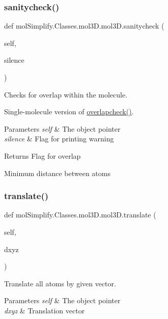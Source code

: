\subsubsection{\texorpdfstring{sanitycheck()}{sanitycheck()}}
{\footnotesize\ttfamily def mol\+Simplify.\+Classes.\+mol3\+D.\+mol3\+D.\+sanitycheck (\begin{DoxyParamCaption}\item[{}]{self,  }\item[{}]{silence }\end{DoxyParamCaption})}



Checks for overlap within the molecule. 

Single-\/molecule version of \hyperlink{classmolSimplify_1_1Classes_1_1mol3D_1_1mol3D_aab1e703e70f941dfc764a47dfdd6a121}{overlapcheck()}. 
\begin{DoxyParams}{Parameters}
{\em self} & The object pointer \\
\hline
{\em silence} & Flag for printing warning \\
\hline
\end{DoxyParams}
\begin{DoxyReturn}{Returns}
Flag for overlap 

Minimum distance between atoms 
\end{DoxyReturn}
\mbox{\label{classmolSimplify_1_1Classes_1_1mol3D_1_1mol3D_a27bd691cb90ab44c3acc746dc637baed}} 
\subsubsection{\texorpdfstring{translate()}{translate()}}
{\footnotesize\ttfamily def mol\+Simplify.\+Classes.\+mol3\+D.\+mol3\+D.\+translate (\begin{DoxyParamCaption}\item[{}]{self,  }\item[{}]{dxyz }\end{DoxyParamCaption})}



Translate all atoms by given vector. 


\begin{DoxyParams}{Parameters}
{\em self} & The object pointer \\
\hline
{\em dxyz} & Translation vector \\
\hline
\end{DoxyParams}
\mbox{\label{classmolSimplify_1_1Classes_1_1mol3D_1_1mol3D_a773c0ca887457100e8034a8eacc28103}} 
